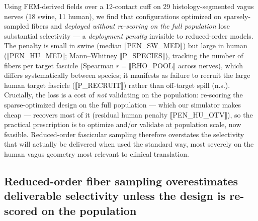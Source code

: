 
Using FEM-derived fields over a 12-contact cuff on 29 histology-segmented
vagus nerves (18 swine, 11 human), we find that configurations optimized on
sparsely-sampled fibers and \emph{deployed without re-scoring on the full
population} lose substantial selectivity --- a \emph{deployment penalty}
invisible to reduced-order models.  The penalty is small in swine
(median ⟦PEN_SW_MED⟧) but large in human (⟦PEN_HU_MED⟧; Mann--Whitney
⟦P_SPECIES⟧), tracking the number of fibers per target fascicle
(Spearman $r=$⟦RHO_POOL⟧ across nerves), which differs systematically
between species; it manifests as failure to recruit the large human target
fascicle (⟦P_RECRUIT⟧) rather than off-target spill (n.s.).  Crucially, the
loss is a cost of \emph{not} validating on the population: re-scoring the
sparse-optimized design on the full population --- which our simulator makes
cheap --- recovers most of it (residual human penalty ⟦PEN_HU_OTV⟧), so the
practical prescription is to optimize and/or validate at population scale,
now feasible.  Reduced-order fascicular sampling therefore overstates the
selectivity that will actually be delivered when used the standard way, most
severely on the human vagus geometry most relevant to clinical translation.

\subsection{Reduced-order fiber sampling overestimates deliverable
  selectivity unless the design is re-scored on the population}
\label{sec:results-sparse}


